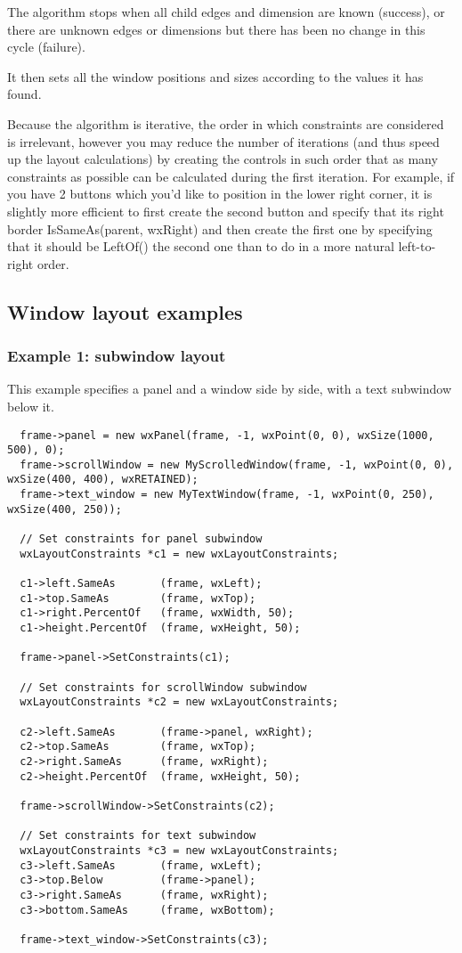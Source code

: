 The algorithm stops when all child edges and dimension are known (success), or 
there are unknown edges or dimensions but there has been no change in this cycle (failure).

It then sets all the window positions and sizes according to the values it has found.

Because the algorithm is iterative, the order in which constraints are considered is
irrelevant, however you may reduce the number of iterations (and thus speed up
the layout calculations) by creating the controls in such order that as many
constraints as possible can be calculated during the first iteration. For example, if
you have 2 buttons which you'd like to position in the lower right corner, it is
slightly more efficient to first create the second button and specify that its
right border IsSameAs(parent, wxRight) and then create the first one by
specifying that it should be LeftOf() the second one than to do in a more
natural left-to-right order.

\subsection{Window layout examples}\label{layoutexamples}

\subsubsection{Example 1: subwindow layout}

This example specifies a panel and a window side by side,
with a text subwindow below it.

\begin{verbatim}
  frame->panel = new wxPanel(frame, -1, wxPoint(0, 0), wxSize(1000, 500), 0);
  frame->scrollWindow = new MyScrolledWindow(frame, -1, wxPoint(0, 0), wxSize(400, 400), wxRETAINED);
  frame->text_window = new MyTextWindow(frame, -1, wxPoint(0, 250), wxSize(400, 250));

  // Set constraints for panel subwindow
  wxLayoutConstraints *c1 = new wxLayoutConstraints;

  c1->left.SameAs       (frame, wxLeft);
  c1->top.SameAs        (frame, wxTop);
  c1->right.PercentOf   (frame, wxWidth, 50);
  c1->height.PercentOf  (frame, wxHeight, 50);

  frame->panel->SetConstraints(c1);

  // Set constraints for scrollWindow subwindow
  wxLayoutConstraints *c2 = new wxLayoutConstraints;

  c2->left.SameAs       (frame->panel, wxRight);
  c2->top.SameAs        (frame, wxTop);
  c2->right.SameAs      (frame, wxRight);
  c2->height.PercentOf  (frame, wxHeight, 50);

  frame->scrollWindow->SetConstraints(c2);

  // Set constraints for text subwindow
  wxLayoutConstraints *c3 = new wxLayoutConstraints;
  c3->left.SameAs       (frame, wxLeft);
  c3->top.Below         (frame->panel);
  c3->right.SameAs      (frame, wxRight);
  c3->bottom.SameAs     (frame, wxBottom);

  frame->text_window->SetConstraints(c3);
\end{verbatim}

